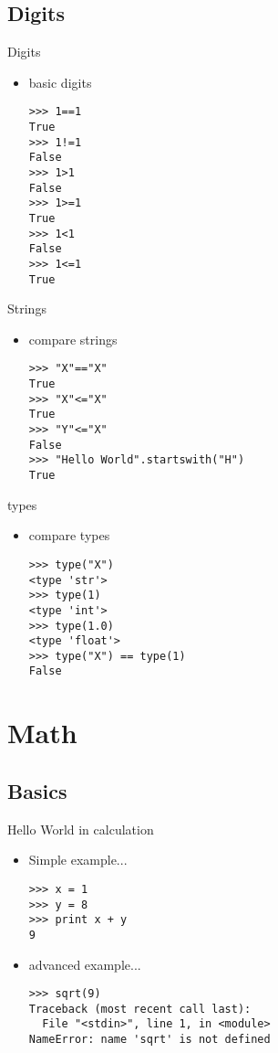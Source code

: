 \documentclass[handout]{beamer}
\begin{document}
    \subsection{Digits}
		\begin{frame}[fragile]{Digits}
			\begin{itemize}
                \item<1-> basic digits
\begin{lstlisting}
>>> 1==1
True
>>> 1!=1
False
>>> 1>1
False
>>> 1>=1
True
>>> 1<1
False
>>> 1<=1
True
\end{lstlisting}
            \end{itemize}
		\end{frame}
		\begin{frame}[fragile]{Strings}
			\begin{itemize}
                \item<1-> compare strings
\begin{lstlisting}
>>> "X"=="X"
True
>>> "X"<="X"
True
>>> "Y"<="X"
False
>>> "Hello World".startswith("H")
True
\end{lstlisting}
            \end{itemize}
		\end{frame}
		\begin{frame}[fragile]{types}
			\begin{itemize}
                \item<1-> compare types
\begin{lstlisting}
>>> type("X")
<type 'str'>
>>> type(1)
<type 'int'>
>>> type(1.0)
<type 'float'>
>>> type("X") == type(1)
False
\end{lstlisting}
            \end{itemize}
		\end{frame}
\section{Math}
    \subsection{Basics}
		\begin{frame}[fragile]{Hello World in calculation}
			\begin{itemize}
                \item<1-> Simple example...
                \begin{lstlisting}
>>> x = 1
>>> y = 8
>>> print x + y
9
\end{lstlisting}
                \item<1-> advanced example...
                \begin{lstlisting}
>>> sqrt(9)
Traceback (most recent call last):
  File "<stdin>", line 1, in <module>
NameError: name 'sqrt' is not defined
\end{lstlisting}
            \end{itemize}
		\end{frame}
\end{document}
